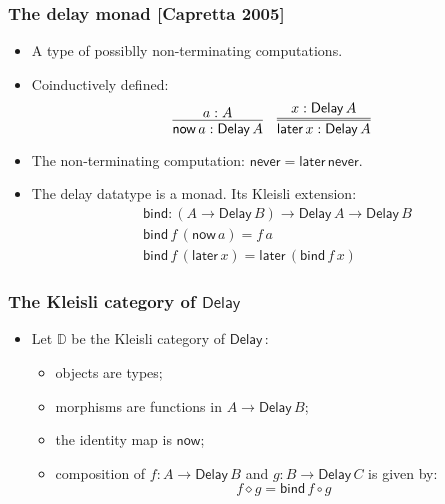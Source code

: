 \documentclass[12pt,t]{beamer}
\newcommand{\comp}{\circ}
\newcommand{\Delay}{\ensuremath{\mathsf{Delay}\,}}
\newcommand{\now}{\mathsf{now}}
\newcommand{\later}{\mathsf{later}}
\newcommand{\never}{\mathsf{never}}
\newcommand{\bind}{\mathsf{bind}}
\newcommand{\D}{\mathbb{D}}
\begin{document}
\begin{frame}

  \frametitle{The delay monad [Capretta 2005]}
  \begin{itemize}
  \item A type of possiblly non-terminating computations.
  \item Coinductively defined:
    \[
    \infer{\now\,a : \Delay A}{a : A}
    \quad
    \infer={\later\,x : \Delay A}{x : \Delay A}
    \]
  \item The non-terminating computation:
    $\never = \later \,\never$.
  \item The delay datatype is a monad. Its Kleisli extension:
    \begin{align*}
      & \bind : (A \to \Delay B) \to \Delay A \to \Delay B \\
      & \bind \,f \, (\now\,a) = f\,a \\
      & \bind\,f\,(\later\,x) = \later\,(\bind\,f\,x)
    \end{align*}

  \end{itemize}
  
  
\end{frame}

\begin{frame}

  \frametitle{The Kleisli category of $\Delay$}
  \begin{itemize}

  \item Let $\D$ be the Kleisli category of $\Delay$:
    \begin{itemize}
    \item objects are types;
    \item morphisms are functions in $A \to \Delay B$;
    \item the identity map is $\now$;
    \item composition of $f : A \to \Delay B$ and $g : B \to \Delay C$
      is given by:
      \[f \diamond g = \bind\,f \comp g\]
    \end{itemize}
   
  \end{itemize}
  
\end{frame}
\end{document}

